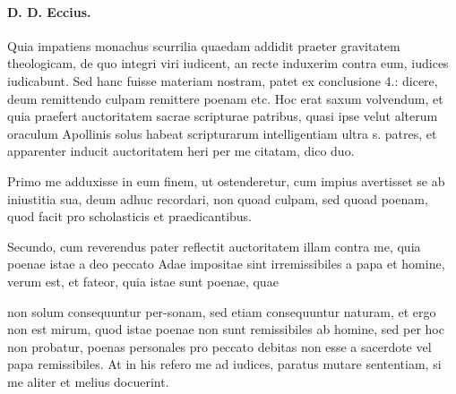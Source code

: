 \paragraph*{D. D. Eccius.}

Quia impatiens monachus scurrilia quaedam addidit praeter gravitatem theologicam, de quo integri viri iudicent, an recte induxerim contra eum, iudices iudicabunt. Sed hanc fuisse materiam nostram, patet ex conclusione 4.: dicere, deum remittendo culpam remittere poenam etc. Hoc erat saxum volvendum, et quia praefert auctoritatem sacrae scripturae patribus, quasi ipse velut alterum oraculum Apollinis solus habeat scripturarum intelligentiam ultra s. patres, et apparenter inducit auctoritatem heri per me citatam, dico duo.

Primo me adduxisse in eum finem, ut ostenderetur, cum impius avertisset se ab iniustitia sua, deum adhuc recordari, non quoad culpam, sed quoad poenam, quod facit pro scholasticis et praedicantibus.

Secundo, cum reverendus pater reflectit auctoritatem illam contra me, quia poenae istae a deo peccato Adae impositae sint irremissibiles a papa et homine, verum est, et fateor, quia istae sunt poenae, quae

non solum consequuntur per-\marginpar{\small[383]}sonam, sed etiam consequuntur naturam, et ergo non est mirum, quod istae poenae non sunt remissibiles ab homine, sed per hoc non probatur, poenas personales pro peccato debitas non esse a sacerdote vel papa remissibiles. At in his refero me ad iudices, paratus mutare sententiam, si me aliter et melius docuerint.


